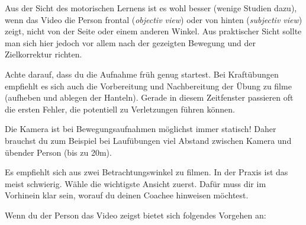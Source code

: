 \documentclass[
  letterpaper,
  DIV=11,
  numbers=noendperiod]{scrreprt}
\begin{document}
Aus der Sicht des motorischen Lernens ist es wohl besser (wenige Studien
dazu), wenn das Video die Person frontal (\emph{objectiv view}) oder von
hinten (\emph{subjectiv view}) zeigt, nicht von der Seite oder einem
anderen Winkel. Aus praktischer Sicht sollte man sich hier jedoch vor
allem nach der gezeigten Bewegung und der Zielkorrektur richten.

Achte darauf, dass du die Aufnahme früh genug startest. Bei Kraftübungen
empfiehlt es sich auch die Vorbereitung und Nachbereitung der Übung zu
filme (aufheben und ablegen der Hanteln). Gerade in diesem Zeitfenster
passieren oft die ersten Fehler, die potentiell zu Verletzungen führen
können.

Die Kamera ist bei Bewegungsaufnahmen möglichst immer statisch! Daher
brauchst du zum Beispiel bei Laufübungen viel Abstand zwischen Kamera
und übender Person (bis zu 20m).

Es empfiehlt sich aus zwei Betrachtungswinkel zu filmen. In der Praxis
ist das meist schwierig. Wähle die wichtigste Ansicht zuerst. Dafür muss
dir im Vorhinein klar sein, worauf du deinen Coachee hinweisen möchtest.

Wenn du der Person das Video zeigst bietet sich folgendes Vorgehen an:
\end{document}
